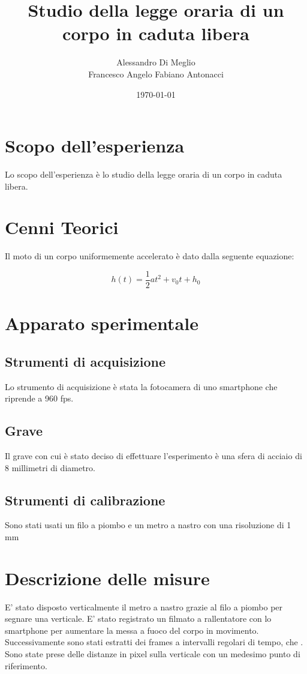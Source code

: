 \documentclass{article}
\title{Studio della legge oraria di un corpo in caduta libera}
\author{Alessandro Di Meglio\\Francesco Angelo Fabiano Antonacci}
\date{\today}
\begin{document}
\maketitle

\section{Scopo dell'esperienza}
Lo scopo dell’esperienza è lo studio della legge oraria di un corpo in caduta libera.

\section {Cenni Teorici}
Il moto di un corpo uniformemente accelerato è dato dalla seguente equazione:

\begin{equation}
h(t)=\frac{1}{2}at^2+v_0t+h_0
\label{fond}
\end{equation}


\section{Apparato sperimentale}
\subsection{Strumenti di acquisizione}
Lo strumento di acquisizione è stata la fotocamera di uno smartphone che riprende a 960 fps.

\subsection{Grave}
Il grave con cui è stato deciso di effettuare l'esperimento è una sfera di acciaio di 8 millimetri di diametro.

\subsection{Strumenti di calibrazione}
Sono stati usati un filo a piombo e un metro a nastro con una risoluzione di 1 mm


\section{Descrizione delle misure}
E' stato disposto verticalmente il metro a nastro grazie al filo a piombo per segnare una verticale.
E' stato registrato un filmato a rallentatore con lo smartphone per aumentare la messa a fuoco del corpo in movimento. 
Successivamente sono stati estratti dei frames a intervalli regolari di tempo, che .
Sono state prese delle distanze in pixel sulla verticale con un medesimo punto di riferimento.
\end{document}
